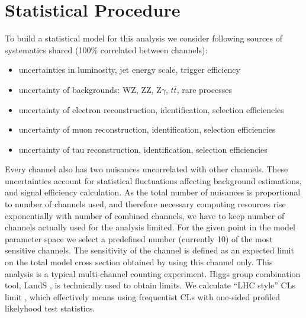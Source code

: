 \newpage
\section{Statistical Procedure}
To build a statistical model for this analysis we consider following sources of systematics
shared (100\% correlated between channels):
\begin{itemize}
\item uncertainties in luminosity, jet energy scale, trigger efficiency
\item uncertainty of backgrounds: WZ, ZZ, Z$\gamma$, $t\bar{t}$, rare processes
\item uncertainty of electron reconstruction, identification, selection efficiencies
\item uncertainty of muon reconstruction, identification, selection efficiencies
\item uncertainty of tau reconstruction, identification, selection efficiencies
\end{itemize}
Every channel also has two nuisances uncorrelated with other channels.
These uncertainties account for statistical fluctuations affecting
background estimations, and signal efficiency calculation.
As the total number of nuisances is proportional to number of channels used,
and therefore necessary computing resources rise exponentially with number
of combined channels,
we have to keep number of channels actually used for the analysis limited.
For the given point in the model parameter space we select a predefined
number (currently 10) of the most sensitive
channels. The sensitivity of the channel is defined as an expected limit
on the total model cross section obtained by using this channel only.
This analysis is a typical multi-channel counting experiment. Higgs group combination
tool, LandS \cite{lands}, is technically used to obtain limits.
We calculate ``LHC style'' CLs limit \cite{higgsCombination},
which effectively means using frequentist CLs with one-sided profiled likelyhood
test statistics.